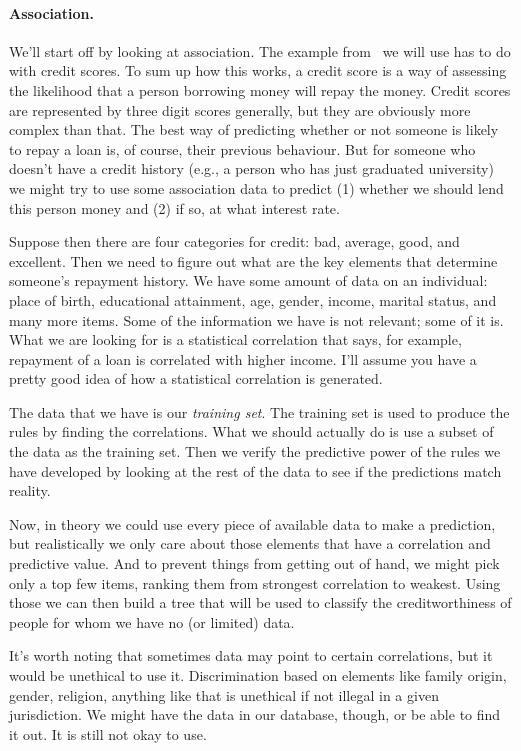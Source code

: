 \documentclass[a4paper]{report}
\begin{document}
\paragraph{Association.} We'll start off by looking at association. The example from~\cite{dsc} we will use has to do with credit scores. To sum up how this works, a credit score is a way of assessing the likelihood that a person borrowing money will repay the money. Credit scores are represented by three digit scores generally, but they are obviously more complex than that. The best way of predicting whether or not someone is likely to repay a loan is, of course, their previous behaviour. But for someone who doesn't have a credit history (e.g., a person who has just graduated university) we might try to use some association data to predict (1) whether we should lend this person money and (2) if so, at what interest rate.

Suppose then there are four categories for credit: bad, average, good, and excellent. Then we need to figure out what are the key elements that determine someone's repayment history. We have some amount of data on an individual: place of birth, educational attainment, age, gender, income, marital status, and many more items. Some of the information we have is  not relevant; some of it is. What we are looking for is a statistical correlation that says, for example, repayment of a loan is correlated with higher income. I'll assume you have a pretty good idea of how a statistical correlation is generated.

The data that we have is our \textit{training set}. The training set is used to produce the rules by finding the correlations. What we should actually do is use a subset of the data as the training set. Then we verify the predictive power of the rules we have developed by looking at the rest of the data to see if the predictions match reality.

Now, in theory we could use every piece of available data to make a prediction, but realistically we only care about those elements that have a correlation and predictive value. And to prevent things from getting out of hand, we might pick only a top few items, ranking them from strongest correlation to weakest. Using those we can then build a tree that will be used to classify the creditworthiness of people for whom we have no (or limited) data.

It's worth noting that sometimes data may point to certain correlations, but it would be unethical to use it. Discrimination based on elements like family origin, gender, religion, anything like that is unethical if not illegal in a given jurisdiction. We might have the data in our database, though, or be able to find it out. It is still not okay to use.
\end{document}
